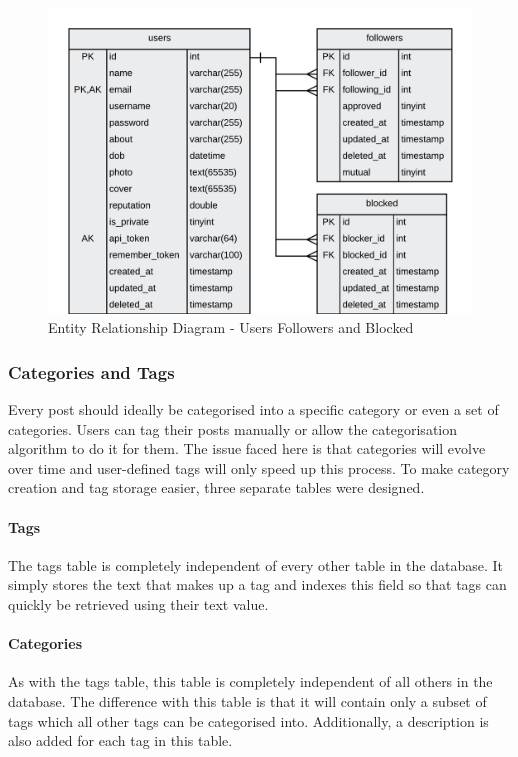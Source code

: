 \begin{figure}[H]
  \centering
  \includegraphics[width=1.0\textwidth]{Images/Design/Database/Followers}
  \caption{Entity Relationship Diagram - Users Followers and Blocked} \label{fig:ERD_Followers}
\end{figure}

\subsubsection{Categories and Tags}
Every post should ideally be categorised into a specific category or even a set of categories. Users can tag their posts manually or allow the categorisation algorithm to do it for them. The issue faced here is that categories will evolve over time and user-defined tags will only speed up this process. To make category creation and tag storage easier, three separate tables were designed. 

\paragraph{Tags}
The tags table is completely independent of every other table in the database. It simply stores the text that makes up a tag and indexes this field so that tags can quickly be retrieved using their text value.

\paragraph{Categories}
As with the tags table, this table is completely independent of all others in the database. The difference with this table is that it will contain only a subset of tags which all other tags can be categorised into. Additionally, a description is also added for each tag in this table.


